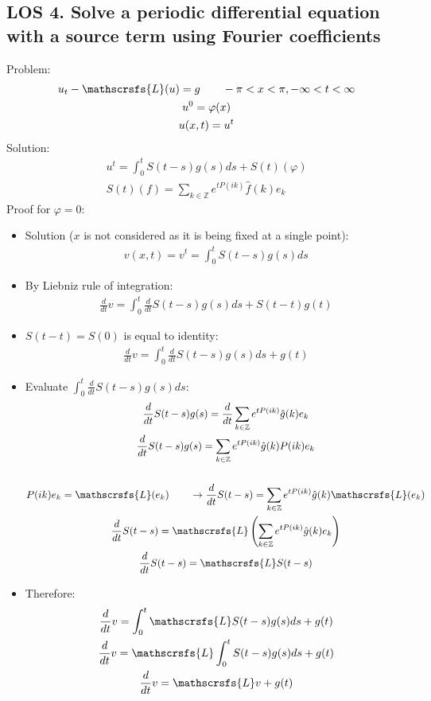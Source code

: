 \documentclass[12pt, a4paper]{article}
\begin{document}
\subsection*{LOS 4. Solve a periodic differential equation with a source term using Fourier coefficients}
Problem:
\begin{gather*}
    u_t - \mathscrsfs{L}(u) = g \qquad -\pi<x<\pi, -\infty<t<\infty\\
    u^0 = \varphi(x)\\
    u(x, t) = u^t
\end{gather*}
Solution:
\begin{gather*}
    u^t = \int^t_0 S(t-s)g(s)ds + S(t)(\varphi)\\
    S(t)(f) = \sum_{k \in \mathbb{Z}}e^{tP(ik)}\hat{f}(k)e_k
\end{gather*}
Proof for $\varphi = 0$:
\begin{itemize}
    \item Solution ($x$ is not considered as it is being fixed at a single point):
    \begin{gather*}
        v(x, t) = v^t = \int_0^t S(t-s)g(s)ds
    \end{gather*}
    \item By Liebniz rule of integration:
    \begin{gather*}
        \frac{d}{dt}v = \int^t_0 \frac{d}{dt} S(t-s)g(s)ds + S(t-t)g(t) 
    \end{gather*}
    \item $S(t-t) = S(0)$ is equal to identity:
    \begin{gather*}
        \frac{d}{dt}v = \int^t_0 \frac{d}{dt} S(t-s)g(s)ds + g(t) 
    \end{gather*} 
    \item Evaluate $\int^t_0 \frac{d}{dt} S(t-s)g(s)ds$:
    \begin{gather*}
        \frac{d}{dt} S(t-s)g(s) = \frac{d}{dt}\sum_{k \in \mathbb{Z}}e^{tP(ik)}\hat{g}(k)e_k\\
        \frac{d}{dt} S(t-s)g(s)= \sum_{k \in \mathbb{Z}}e^{tP(ik)}\hat{g}(k)P(ik)e_k\\\\
        P(ik)e_k = \mathscrsfs{L}(e_k) \qquad \rightarrow\frac{d}{dt} S(t-s) = \sum_{k \in \mathbb{Z}}e^{tP(ik)}\hat{g}(k)\mathscrsfs{L}(e_k)\\
        \frac{d}{dt} S(t-s) = \mathscrsfs{L}\left(\sum_{k \in \mathbb{Z}}e^{tP(ik)}\hat{g}(k)e_k\right)\\
        \frac{d}{dt} S(t-s) = \mathscrsfs{L}S(t-s)
    \end{gather*}
    \item Therefore:
    \begin{gather*}
        \frac{d}{dt}v = \int^t_0 \mathscrsfs{L}S(t-s)g(s)ds + g(t)\\
        \frac{d}{dt}v = \mathscrsfs{L}\int^t_0 S(t-s)g(s)ds + g(t)\\
        \frac{d}{dt}v = \mathscrsfs{L}v + g(t)\\
    \end{gather*}
\end{itemize}
\end{document}
